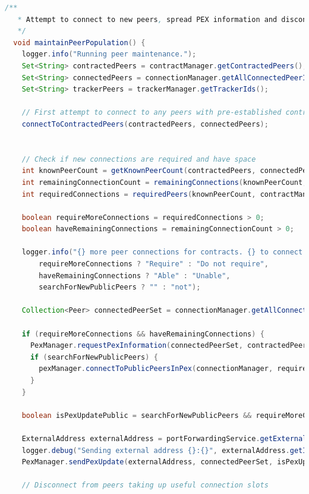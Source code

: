 \documentclass[11pt, a4paper, twoside]{report}
\begin{document}
\begin{lstlisting}[language=Java, caption=Peer Population Control, label=lst:peerPop]
  /**
   * Attempt to connect to new peers, spread PEX information and disconnect redundant peers.
   */
  void maintainPeerPopulation() {
    logger.info("Running peer maintenance.");
    Set<String> contractedPeers = contractManager.getContractedPeers();
    Set<String> connectedPeers = connectionManager.getAllConnectedPeerIds();
    Set<String> trackerPeers = trackerManager.getTrackerIds();

    // First attempt to connect to any peers with pre-established contracts
    connectToContractedPeers(contractedPeers, connectedPeers);


    // Check if new connections are required and have space
    int knownPeerCount = getKnownPeerCount(contractedPeers, connectedPeers, friendPeers, trackerPeers);
    int remainingConnectionCount = remainingConnections(knownPeerCount, maxConnections);
    int requiredConnections = requiredPeers(knownPeerCount, contractManager.getContractCountTarget());

    boolean requireMoreConnections = requiredConnections > 0;
    boolean haveRemainingConnections = remainingConnectionCount > 0;

    logger.info("{} more peer connections for contracts. {} to connect to more peers. Should {} connect to new public peers",
        requireMoreConnections ? "Require" : "Do not require",
        haveRemainingConnections ? "Able" : "Unable",
        searchForNewPublicPeers ? "" : "not");

    Collection<Peer> connectedPeerSet = connectionManager.getAllConnectedPeers();

    if (requireMoreConnections && haveRemainingConnections) {
      PexManager.requestPexInformation(connectedPeerSet, contractedPeers, searchForNewPublicPeers);
      if (searchForNewPublicPeers) {
        pexManager.connectToPublicPeersInPex(connectionManager, requiredConnections);
      }
    }

    boolean isPexUpdatePublic = searchForNewPublicPeers && requireMoreConnections;

    ExternalAddress externalAddress = portForwardingService.getExternalAddress();
    logger.debug("Sending external address {}:{}", externalAddress.getIpAddress(), externalAddress.getPort());
    PexManager.sendPexUpdate(externalAddress, connectedPeerSet, isPexUpdatePublic);

    // Disconnect from peers taking up useful connection slots


\end{lstlisting}
\end{document}
